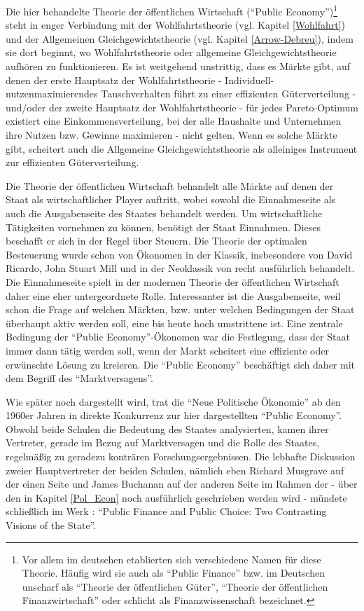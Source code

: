 Die hier behandelte Theorie der öffentlichen Wirtschaft ("`Public Economy"')\footnote{Vor allem im deutschen etablierten sich verschiedene Namen für diese Theorie. Häufig wird sie auch als "`Public Finance"' bzw. im Deutschen unscharf als "`Theorie der öffentlichen Güter"', "`Theorie der öffentlichen Finanzwirtschaft"' oder schlicht als Finanzwissenschaft bezeichnet.} steht in enger Verbindung mit der Wohlfahrtstheorie (vgl. Kapitel \ref{Wohlfahrt}) und der Allgemeinen Gleichgewichtstheorie (vgl. Kapitel \ref{Arrow-Debreu}), indem sie dort beginnt, wo Wohlfahrtstheorie oder allgemeine Gleichgewichtstheorie aufhören zu funktionieren. Es ist weitgehend unstrittig, dass es Märkte gibt, auf denen der erste Hauptsatz der Wohlfahrtstheorie - Individuell-nutzenmaximierendes Tauschverhalten führt zu einer effizienten Güterverteilung - und/oder der zweite Hauptsatz der Wohlfahrtstheorie - für jedes Pareto-Optimum existiert eine Einkommensverteilung, bei der alle Haushalte und Unternehmen ihre Nutzen bzw. Gewinne maximieren - nicht gelten. Wenn es solche Märkte gibt, scheitert auch die Allgemeine Gleichgewichtstheorie als alleiniges Instrument zur effizienten Güterverteilung.

Die Theorie der öffentlichen Wirtschaft behandelt alle Märkte auf denen der Staat als wirtschaftlicher Player auftritt, wobei sowohl die Einnahmeseite als auch die Ausgabenseite des Staates behandelt werden. Um wirtschaftliche Tätigkeiten vornehmen zu können, benötigt der Staat Einnahmen. Dieses beschafft er sich in der Regel über Steuern. Die Theorie der optimalen Besteuerung wurde schon von Ökonomen in der Klassik, insbesondere von David Ricardo, John Stuart Mill und in der Neoklassik von \textcite[Kapitel 38]{Walras1874} recht ausführlich behandelt. Die Einnahmeseite spielt in der modernen Theorie der öffentlichen Wirtschaft daher eine eher untergeordnete Rolle. Interessanter ist die Ausgabenseite, weil schon die Frage auf welchen Märkten, bzw. unter welchen Bedingungen der Staat überhaupt aktiv werden soll, eine bis heute hoch umstrittene ist. Eine zentrale Bedingung der "`Public Economy"'-Ökonomen war die Festlegung, dass der Staat immer dann tätig werden soll, wenn der Markt scheitert eine effiziente oder erwünschte Lösung zu kreieren. Die "`Public Economy"' beschäftigt sich daher mit dem Begriff des "`Marktversagens"'.

Wie später noch dargestellt wird, trat die "`Neue Politische Ökonomie"' ab den 1960er Jahren in direkte Konkurrenz zur hier dargestellten "`Public Economy"'. Obwohl beide Schulen die Bedeutung des Staates analysierten, kamen ihrer Vertreter, gerade im Bezug auf Marktversagen und die Rolle des Staates, regelmäßig zu geradezu konträren Forschungsergebnissen. Die lebhafte Diskussion zweier Hauptvertreter der beiden Schulen, nämlich eben Richard Musgrave auf der einen Seite und James Buchanan auf der anderen Seite im Rahmen der - über den in Kapitel \ref{Pol_Econ} noch ausführlich geschrieben werden wird - mündete schließlich im Werk \textcite{Musgrave1999}: "`Public Finance and Public Choice: Two Contrasting Visions of the State"'.

